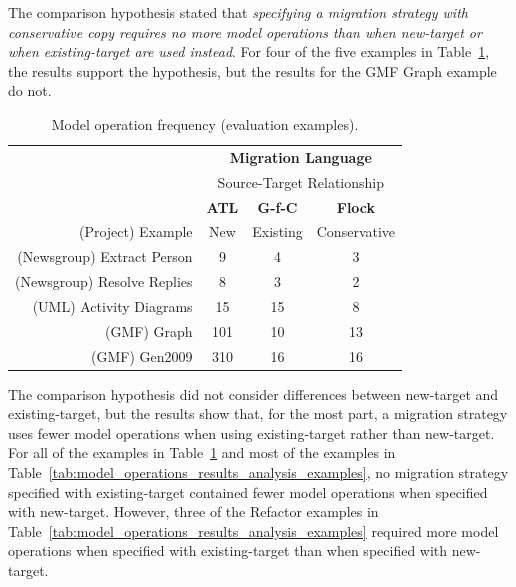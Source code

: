 The comparison hypothesis stated that \emph{specifying a migration strategy with conservative copy requires no more model operations than when new-target or when existing-target are used instead}. For four of the five examples in Table~\ref{tab:model_operations_results}, the results support the hypothesis, but the results for the GMF Graph example do not.

\begin{table}
	\centering
	\begin{tabular}{|r|c|c|c|}
		\hline
		                              & \multicolumn{3}{|c|}{\textbf{Migration Language}} \\
													  			& \multicolumn{3}{|c|}{Source-Target Relationship} \\
		\hline
		                              & \textbf{ATL} & \textbf{G-f-C} & \textbf{Flock} \\
		(Project) Example             & New & Existing & Conservative \\
		\hline
		\hline
		(Newsgroup) Extract Person    & 9  &  4  &  3  \\
		\hline                       
		(Newsgroup) Resolve Replies   &  8  &  3  &  2  \\
		\hline                       
		(UML) Activity Diagrams       &  15  &  15  &  8  \\
		\hline                       
		(GMF) Graph                   &  101  &  10  &  13  \\
		\hline                       
		(GMF) Gen2009                 &  310  &  16  &  16  \\
		\hline
	\end{tabular}
	\caption{Model operation frequency (evaluation examples).}
	\label{tab:model_operations_results}
\end{table}

The comparison hypothesis did not consider differences between new-target and existing-target, but the results show that, for the most part, a migration strategy uses fewer model operations when using existing-target rather than new-target. For all of the examples in Table~\ref{tab:model_operations_results} and most of the examples in Table~\ref{tab:model_operations_results_analysis_examples}, no migration strategy specified with existing-target contained fewer model operations when specified with new-target. However, three of the Refactor examples in Table~\ref{tab:model_operations_results_analysis_examples} required more model operations when specified with existing-target than when specified with new-target.

